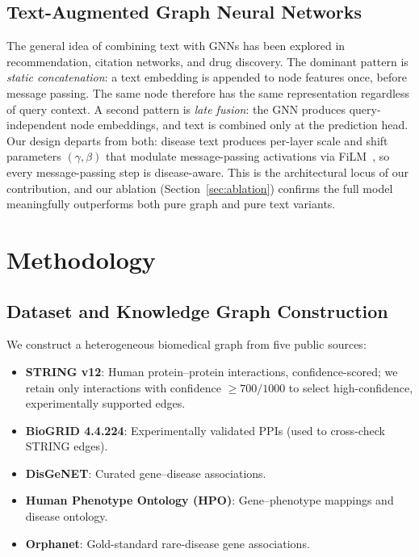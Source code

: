 \documentclass[conference]{IEEEtran}
\begin{document}
\subsection{Text-Augmented Graph Neural Networks}
The general idea of combining text with GNNs has been explored in recommendation, citation networks, and drug discovery. The dominant pattern is \emph{static concatenation}: a text embedding is appended to node features once, before message passing. The same node therefore has the same representation regardless of query context. A second pattern is \emph{late fusion}: the GNN produces query-independent node embeddings, and text is combined only at the prediction head. Our design departs from both: disease text produces per-layer scale and shift parameters $(\gamma,\beta)$ that modulate message-passing activations via FiLM~\cite{perez2018film}, so every message-passing step is disease-aware. This is the architectural locus of our contribution, and our ablation (Section~\ref{sec:ablation}) confirms the full model meaningfully outperforms both pure graph and pure text variants.

\section{Methodology}
\label{sec:methodology}

\subsection{Dataset and Knowledge Graph Construction}
We construct a heterogeneous biomedical graph from five public sources:

\begin{itemize}
    \item \textbf{STRING v12}: Human protein--protein interactions, confidence-scored; we retain only interactions with confidence $\geq\!700/1000$ to select high-confidence, experimentally supported edges.
    \item \textbf{BioGRID 4.4.224}: Experimentally validated PPIs (used to cross-check STRING edges).
    \item \textbf{DisGeNET}: Curated gene--disease associations.
    \item \textbf{Human Phenotype Ontology (HPO)}: Gene--phenotype mappings and disease ontology.
    \item \textbf{Orphanet}: Gold-standard rare-disease gene associations.
\end{itemize}
\end{document}
